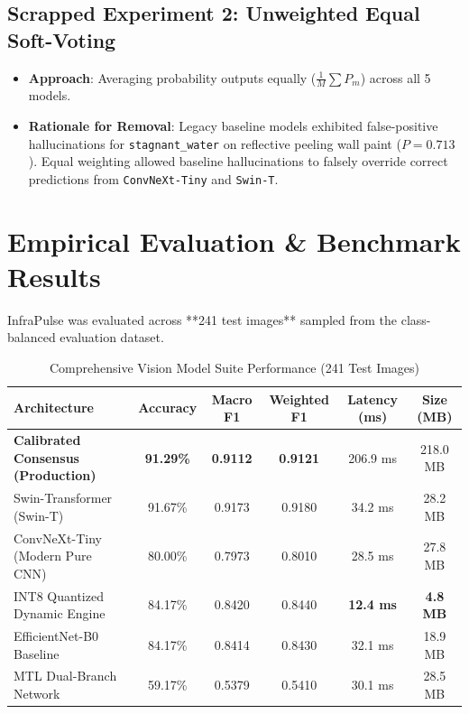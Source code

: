 \documentclass[11pt,a4paper]{article}
\begin{document}
\subsection{Scrapped Experiment 2: Unweighted Equal Soft-Voting}
\begin{itemize}
    \item \textbf{Approach}: Averaging probability outputs equally ($\frac{1}{M} \sum P_m$) across all 5 models.
    \item \textbf{Rationale for Removal}: Legacy baseline models exhibited false-positive hallucinations for \texttt{stagnant\_water} on reflective peeling wall paint ($P=0.713$). Equal weighting allowed baseline hallucinations to falsely override correct predictions from \texttt{ConvNeXt-Tiny} and \texttt{Swin-T}.

\end{itemize}

\section{Empirical Evaluation \& Benchmark Results}

InfraPulse was evaluated across **241 test images** sampled from the class-balanced evaluation dataset.

\begin{table}[H]
\centering
\caption{Comprehensive Vision Model Suite Performance (241 Test Images)}
\label{tab:benchmarks}
\begin{tabular}{lccccc}
\toprule
\textbf{Architecture} & \textbf{Accuracy} & \textbf{Macro F1} & \textbf{Weighted F1} & \textbf{Latency (ms)} & \textbf{Size (MB)} \\
\midrule
\textbf{Calibrated Consensus (Production)} & \textbf{91.29\%} & \textbf{0.9112} & \textbf{0.9121} & 206.9 ms & 218.0 MB \\
Swin-Transformer (Swin-T) & 91.67\% & 0.9173 & 0.9180 & 34.2 ms & 28.2 MB \\
ConvNeXt-Tiny (Modern Pure CNN) & 80.00\% & 0.7973 & 0.8010 & 28.5 ms & 27.8 MB \\
INT8 Quantized Dynamic Engine & 84.17\% & 0.8420 & 0.8440 & \textbf{12.4 ms} & \textbf{4.8 MB} \\
EfficientNet-B0 Baseline & 84.17\% & 0.8414 & 0.8430 & 32.1 ms & 18.9 MB \\
MTL Dual-Branch Network & 59.17\% & 0.5379 & 0.5410 & 30.1 ms & 28.5 MB \\
\bottomrule
\end{tabular}
\end{table}
\end{document}
